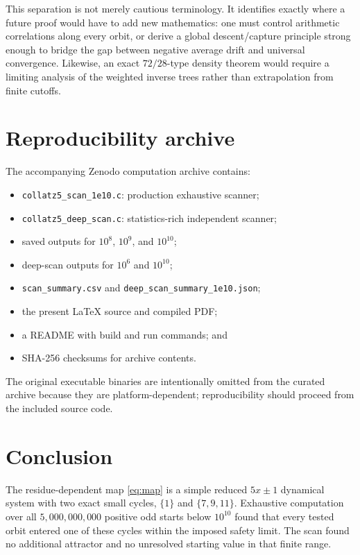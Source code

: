 \documentclass[11pt]{article}
\begin{document}
This separation is not merely cautious terminology.  It identifies exactly where a future proof would have to add new mathematics: one must control arithmetic correlations along every orbit, or derive a global descent/capture principle strong enough to bridge the gap between negative average drift and universal convergence.  Likewise, an exact $72/28$-type density theorem would require a limiting analysis of the weighted inverse trees rather than extrapolation from finite cutoffs.

\section{Reproducibility archive}

The accompanying Zenodo computation archive contains:
\begin{itemize}
\item \texttt{collatz5\_scan\_1e10.c}: production exhaustive scanner;
\item \texttt{collatz5\_deep\_scan.c}: statistics-rich independent scanner;
\item saved outputs for \(10^8\), \(10^9\), and \(10^{10}\);
\item deep-scan outputs for \(10^6\) and \(10^{10}\);
\item \texttt{scan\_summary.csv} and \texttt{deep\_scan\_summary\_1e10.json};
\item the present \LaTeX{} source and compiled PDF;
\item a README with build and run commands; and
\item SHA-256 checksums for archive contents.
\end{itemize}

The original executable binaries are intentionally omitted from the curated archive because they are platform-dependent; reproducibility should proceed from the included source code.

\section{Conclusion}

The residue-dependent map \eqref{eq:map} is a simple reduced \(5x\pm1\) dynamical system with two exact small cycles, \(\{1\}\) and \(\{7,9,11\}\). Exhaustive computation over all \(5{,}000{,}000{,}000\) positive odd starts below \(10^{10}\) found that every tested orbit entered one of these cycles within the imposed safety limit. The scan found no additional attractor and no unresolved starting value in that finite range.
\end{document}
